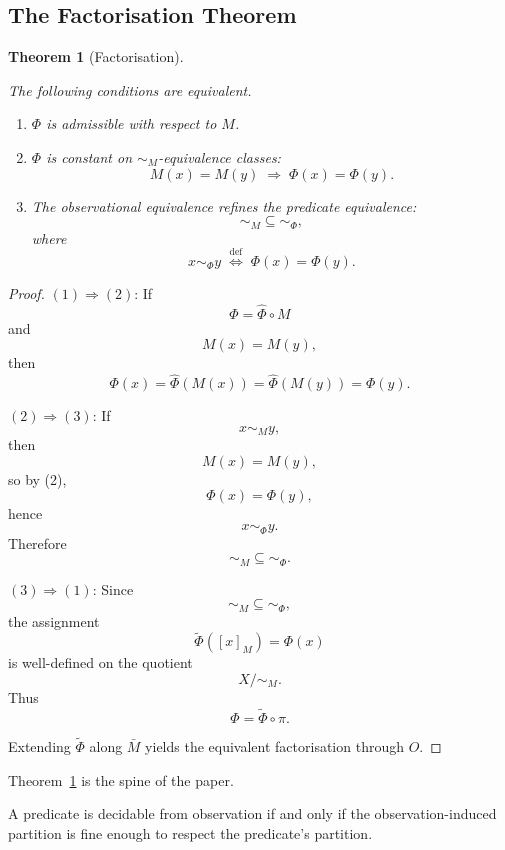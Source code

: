 \documentclass[12pt]{article}
\theoremstyle{plain}
\newtheorem{theorem}{Theorem}[section]
\theoremstyle{definition}
\theoremstyle{remark}
\begin{document}
\subsection{The Factorisation Theorem}

\begin{theorem}[Factorisation]
\label{thm:factorisation}

The following conditions are equivalent.

\begin{enumerate}[label=(\arabic*),noitemsep]
  \item $\Phi$ is admissible with respect to $M$.

  \item $\Phi$ is constant on $\sim_M$-equivalence classes:
        \[
        M(x) = M(y)
        \;\Rightarrow\;
        \Phi(x) = \Phi(y).
        \]

  \item The observational equivalence refines the predicate
        equivalence:
        \[
        \sim_M \subseteq \sim_{\Phi},
        \]
        where
        \[
        x \sim_{\Phi} y
        \;\stackrel{\mathrm{def}}{\iff}\;
        \Phi(x) = \Phi(y).
        \]
\end{enumerate}
\end{theorem}

\begin{proof}

$(1)\Rightarrow(2)$:
If
\[
\Phi = \hat{\Phi} \circ M
\]
and
\[
M(x) = M(y),
\]
then
\[
\Phi(x)
=
\hat{\Phi}(M(x))
=
\hat{\Phi}(M(y))
=
\Phi(y).
\]

$(2)\Rightarrow(3)$:
If
\[
x \sim_M y,
\]
then
\[
M(x) = M(y),
\]
so by (2),
\[
\Phi(x) = \Phi(y),
\]
hence
\[
x \sim_{\Phi} y.
\]
Therefore
\[
\sim_M \subseteq \sim_{\Phi}.
\]

$(3)\Rightarrow(1)$:
Since
\[
\sim_M \subseteq \sim_{\Phi},
\]
the assignment
\[
\widetilde{\Phi}([x]_M) = \Phi(x)
\]
is well-defined on the quotient
\[
X/{\sim_M}.
\]
Thus
\[
\Phi = \widetilde{\Phi} \circ \pi.
\]

Extending $\widetilde{\Phi}$ along $\bar{M}$ yields the equivalent
factorisation through $O$.
\end{proof}

Theorem~\ref{thm:factorisation} is the spine of the paper.

A predicate is decidable from observation if and only if the
observation-induced partition is fine enough to respect the
predicate's partition.
\end{document}
